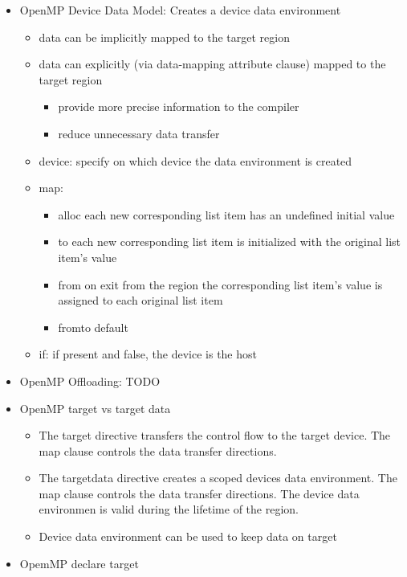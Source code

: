 \documentclass[paper=a4, fontsize=11pt]{scrartcl} %
\numberwithin{equation}{section} %
\numberwithin{figure}{section} %
\numberwithin{table}{section} %
\begin{document}
\begin{itemize}
\begin{itemize}
  \end{itemize}
  \item OpenMP Device Data Model: Creates a device data environment
  \begin{itemize}
    \item data can be implicitly mapped to the target region
    \item data can explicitly (via data-mapping attribute clause) mapped to the target region
    \begin{itemize}
      \item provide more precise information to the compiler
      \item reduce unnecessary data transfer
    \end{itemize}
    \item device: specify on which device the data environment is created
    \item map:
    \begin{itemize}
      \item alloc each new corresponding list item has an undefined initial value
      \item to each new corresponding list item is initialized with the original list item's value
      \item from on exit from the region the corresponding list item's value is assigned to each original list item
      \item fromto default
    \end{itemize}
    \item if: if present and false, the device is the host
  \end{itemize}
  \item OpenMP Offloading: TODO
  \item OpenMP target vs target data
  \begin{itemize}
    \item The target directive transfers the control flow to the target device. The map clause controls the data transfer directions.
    \item The targetdata directive creates a scoped devices data environment. The map clause controls the data transfer directions. The device data environmen is valid during the lifetime of the region.
    \item Device data environment can be used to keep data on target
  \end{itemize}
  \item OpemMP declare target
  \begin{itemize}

\end{itemize}
\end{itemize}
\end{document}
